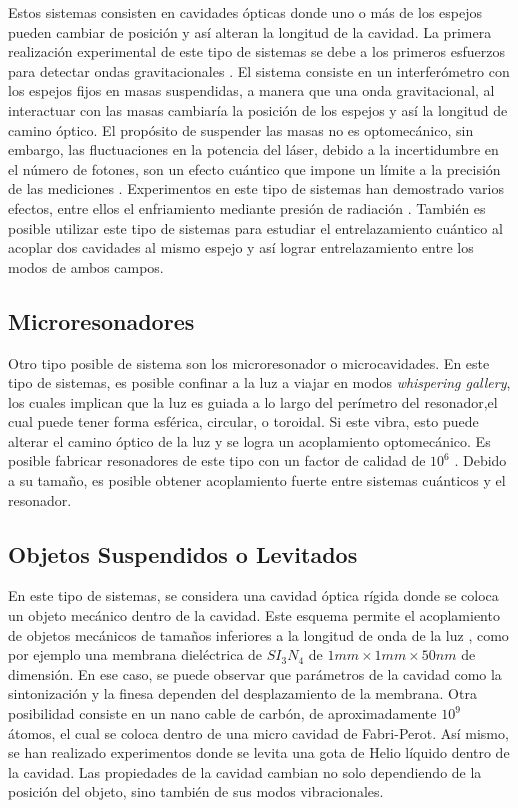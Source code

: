 \documentclass[10pt,a4paper]{report}
\begin{document}
Estos sistemas consisten en cavidades ópticas donde uno o más de los espejos pueden cambiar de posición y así alteran la longitud de la cavidad. La primera realización experimental de este tipo de sistemas se debe a los primeros esfuerzos para detectar ondas gravitacionales \cite{AbramoviciLIGO}. El sistema consiste en un interferómetro con los espejos fijos en masas suspendidas, a manera que una onda gravitacional, al interactuar con las masas cambiaría la posición de los espejos y así la longitud de camino óptico. El propósito de suspender las masas no es optomecánico, sin embargo, las fluctuaciones en la potencia del láser, debido a la incertidumbre en el número de fotones, son un efecto cuántico que impone un límite a la precisión de las mediciones \cite{CavesIF}. Experimentos en este tipo de sistemas han demostrado varios efectos, entre ellos el enfriamiento mediante presión de radiación \cite{CorbittOC}. También es posible utilizar este tipo de sistemas para estudiar el entrelazamiento cuántico\cite{ChenED} al acoplar dos cavidades al mismo espejo y así lograr entrelazamiento entre los modos de ambos campos.

\subsection{Microresonadores}

Otro tipo posible de sistema son los microresonador o microcavidades. En este tipo de sistemas, es posible confinar a la luz a viajar en modos \textit{whispering gallery}, los cuales implican que la luz es guiada a lo largo del perímetro del resonador,el cual puede tener forma esférica, circular, o toroidal\cite{VahalaOM}. Si este vibra, esto puede alterar el camino óptico de la luz y se logra un acoplamiento optomecánico. Es posible fabricar resonadores de este tipo con un factor de calidad de $10^6$ \cite{EuroSensors2017}. Debido a su tamaño, es posible obtener acoplamiento fuerte entre sistemas cuánticos y el resonador\cite{VerhagenMOC}.

\subsection{Objetos Suspendidos o Levitados}

En este tipo de sistemas, se considera una cavidad óptica rígida donde se coloca un objeto mecánico dentro de la cavidad. Este esquema permite el acoplamiento de objetos mecánicos de tamaños inferiores a la longitud de onda de la luz \cite{KippenberCO}, como por ejemplo una membrana dieléctrica de $SI_3N_4$ de  $1mm \times 1mm \times 50nm$
de dimensión\cite{SankeyMC}. En ese caso, se puede observar que parámetros de la cavidad como la sintonización y la finesa dependen del desplazamiento de la membrana. Otra posibilidad consiste en un nano cable de carbón, de aproximadamente $10^9$ átomos, el cual se coloca dentro de una micro cavidad de Fabri-Perot. Así mismo, se han realizado experimentos donde se levita una gota de Helio líquido dentro de la cavidad\cite{ChildressLD}. Las propiedades de la cavidad cambian no solo dependiendo de la posición del objeto, sino también de sus modos vibracionales\cite{FaveroCR}.  
\end{document}
